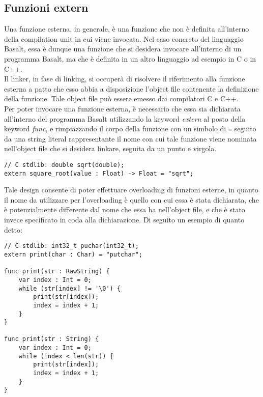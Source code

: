 \subsection{Funzioni extern}
Una funzione esterna, in generale, è una funzione che non è definita all'interno della compilation unit in cui viene 
invocata. Nel caso concreto del linguaggio Basalt, essa è dunque una funzione che si desidera invocare all'interno
di un programma Basalt, ma che è definita in un altro linguaggio ad esempio in C o in C++. \\

Il linker, in fase di linking, si occuperà di risolvere il riferimento alla funzione esterna a patto che 
esso abbia a disposizione l'object file contenente la definizione della funzione. Tale object file può 
essere emesso dai compilatori C e C++. \\

Per poter invocare una funzione esterna, è necessario che essa sia dichiarata all'interno del programma Basalt
utilizzando la keyword \textit{extern} al posto della keyword \textit{func}, e rimpiazzando il corpo della funzione
con un simbolo di \texttt{=} seguito da una string literal rappresentante il nome con cui tale funzione viene nominata 
nell'object file che si desidera linkare, seguita da un punto e virgola. \\

\vspace{0.5cm}
\begin{lstlisting}[frame=single]
// C stdlib: double sqrt(double);
extern square_root(value : Float) -> Float = "sqrt";
\end{lstlisting}
\vspace{0.5cm}

Tale design consente di poter effettuare overloading di funzioni esterne, in quanto il nome da utilizzare per
l'overloading è quello con cui essa è stata dichiarata, che è potenzialmente differente dal nome che essa ha
nell'object file, e che è stato invece specificato in coda alla dichiarazione. Di seguito un esempio di quanto detto: \\

\vspace{0.5cm}
\begin{lstlisting}[frame=single]
// C stdlib: int32_t puchar(int32_t);
extern print(char : Char) = "putchar";

func print(str : RawString) {
    var index : Int = 0;
    while (str[index] != '\0') {
        print(str[index]);
        index = index + 1;
    }
}

func print(str : String) {
    var index : Int = 0;
    while (index < len(str)) {
        print(str[index]);
        index = index + 1;
    }
}
\end{lstlisting}
\vspace{0.5cm}
